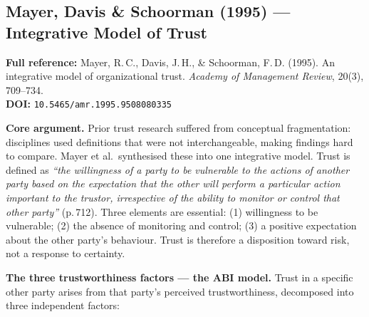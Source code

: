 \documentclass[11pt, a4paper]{article}
\begin{document}
\subsection{Mayer, Davis \& Schoorman (1995) --- Integrative Model of Trust}

\begin{infobox}
\small
\textbf{Full reference:} Mayer, R.\,C., Davis, J.\,H., \& Schoorman, F.\,D. (1995). An integrative model of organizational trust. \textit{Academy of Management Review}, 20(3), 709--734.\\[4pt]
\textbf{DOI:} \texttt{10.5465/amr.1995.9508080335}
\end{infobox}

\textbf{Core argument.} Prior trust research suffered from conceptual fragmentation: disciplines used definitions that were not interchangeable, making findings hard to compare. Mayer et al.\ synthesised these into one integrative model. Trust is defined as \textit{``the willingness of a party to be vulnerable to the actions of another party based on the expectation that the other will perform a particular action important to the trustor, irrespective of the ability to monitor or control that other party''} (p.\,712). Three elements are essential: (1) willingness to be vulnerable; (2) the absence of monitoring and control; (3) a positive expectation about the other party's behaviour. Trust is therefore a disposition toward risk, not a response to certainty.

\medskip
\noindent\textbf{The three trustworthiness factors --- the ABI model.} Trust in a specific other party arises from that party's perceived trustworthiness, decomposed into three independent factors:
\end{document}
